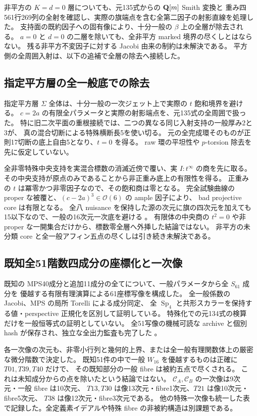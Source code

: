 \documentclass[11pt,a4paper]{ltjsarticle}
\DeclareMathOperator{\Sp}{Sp}\DeclareMathOperator{\CSp}{CSp}
\theoremstyle{remark}\newtheorem{remark}[proposition]{注意}
\begin{document}
非平方の $K=d=0$ 層についても、元135式からの $\mathbf Q[m]$ Smith 変換と
重み四561行269列の全射を確認し、実際の旗端点を含む全第二因子の射影直線を処理した。
支持面の既約因子への固有像により、十分一般の $\beta$ 上の全層が除去される。
$a=0$ と $d=0$ の二層を除いても、全非平方 marked 境界の尽くしとはならない。
残る非平方不変因子に対する Jacobi 由来の制約は未解決である。
平方側の全周囲入射は、以下の追補で全層の除去へ接続した。

\subsection{指定平方層の全一般底での除去}
指定平方層 $\Sigma$ 全体は、十分一般の一次ジェット上で実際の $t$ 飽和境界を避ける。
$c=2a$ の有限全パラメータと実際の射影端点を、元135式の全周囲で扱った。
特に旧二次平面の重根接続では、二つの異なる同じ入射支持の一般厚み2と3が、
真の混合切断による特殊横断長5を使い切る。
元の全完成環そのものが正則17切断の底上自由5となり、$t=0$ を得る。
raw 環の平坦性や $p$-torsion 除去を先に仮定していない。

全非零特殊中央支持を実混合標数の消滅近傍で覆い、実 $I:t^\infty$ の商を先に取る。
その中央支持が原点のみであることから非正重み底上の有限性を得る。
正重みの $t$ は冪零かつ非零因子なので、その飽和商は零となる。
完全試験曲線の proper な被覆と、$(c-2a)^3\in\mathcal O(6)$ の ample 因子により、
bad projective core は有限となる。
全八 nuisance を保持した源の次元に旗の四次元を加えても15以下なので、一般の16次元一次底を避ける
\cite{sigma-full-v62}。
有限体の中央商の $t^2=0$ や非 proper な一開集合だけから、標数零全層へ外挿した結論ではない。
非平方の未分類 core と全一般アフィン五点の尽くしは引き続き未解決である。

\subsection{既知全51階数四成分の座標化と一次像}
既知の MPS40成分と追加11成分の全てについて、一般パラメータから全 $S_{61}$ 成分を
優越する有限有理演算による61座標写像を構成した。
全一般係数の Jacobi、MPS の局所 Torelli による成分同定、
全 $\Sp_4$ と共形スカラーを保持する値・perspective 正規化を区別して証明している。
特殊化での元134式の検算だけを一般恒等式の証明としていない。
全51写像の機械可読な archive と個別 hash が保存され、独立な全出力監査も完了した
\cite{known51-v62}。

各一次像の次元も、非零小行列と幾何的上界、または全一般有理関数体上の厳密な微分階数で決定した。
既知51件の中で一般 $W_{16}$ を優越するものは正確に $T01,T39,T40$ だけで、
その既知部分の一般 fibre は被約五点で尽くされる。
これは未知成分からの点を除いたという結論ではない。
$\mathcal C_A,\mathcal C_B$ の一次像は9次元・一般 fibre は10次元、
$T13,T30$ は像13次元・fibre1次元、$T21$ は像10次元・fibre5次元、
$T38$ は像12次元・fibre3次元である\cite{known51-jets-v62}。
他の特殊一次像も統一した表で記録した。全定義素イデアルや特殊 fibre の非被約構造は別課題である。
\end{document}
